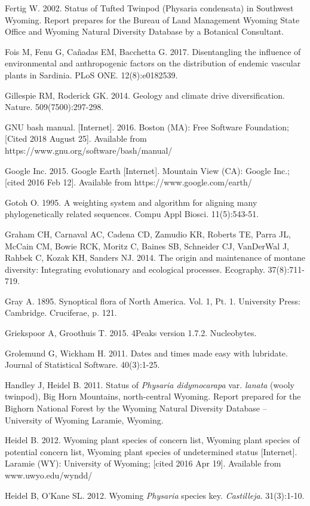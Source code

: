 Fertig W. 2002. Status of Tufted Twinpod (Physaria condensata) in Southwest Wyoming. Report prepares for the Bureau of Land Management Wyoming State Office and Wyoming Natural Diversity Database by a Botanical Consultant.

Fois M, Fenu G, Cañadas EM, Bacchetta G. 2017. Disentangling the influence of environmental and anthropogenic factors on the distribution of endemic vascular plants in Sardinia. PLoS ONE. 12(8):e0182539.

Gillespie RM, Roderick GK. 2014. Geology and climate drive diversification. Nature. 509(7500):297-298.

GNU bash manual. [Internet]. 2016. Boston (MA): Free Software Foundation; [Cited 2018 August 25]. Available from https://www.gnu.org/software/bash/manual/

Google Inc. 2015. Google Earth [Internet]. Mountain View (CA): Google Inc.; [cited 2016 Feb 12]. Available from https://www.google.com/earth/

Gotoh O. 1995. A weighting system and algorithm for aligning many phylogenetically related sequences. Compu Appl Biosci. 11(5):543-51.

Graham CH, Carnaval AC, Cadena CD, Zamudio KR, Roberts TE, Parra JL, McCain CM, Bowie RCK, Moritz C, Baines SB, Schneider CJ, VanDerWal J, Rahbek C, Kozak KH, Sanders NJ. 2014. The origin and maintenance of montane diversity: Integrating evolutionary and ecological processes. Ecography. 37(8):711-719.

Gray A. 1895. Synoptical flora of North America. Vol. 1, Pt. 1. University Press: Cambridge. Cruciferae, p. 121.

Griekspoor A, Groothuis T. 2015. 4Peaks version 1.7.2. Nucleobytes.

Grolemund G, Wickham H. 2011. Dates and times made easy with lubridate. Journal of Statistical Software. 40(3):1-25.

Handley J, Heidel B. 2011. Status of \textit{Physaria didymocarapa} var. \textit{lanata} (wooly twinpod), Big Horn Mountains, north-central Wyoming. Report prepared for the Bighorn National Forest by the Wyoming Natural Diversity Database – University of Wyoming Laramie, Wyoming.  

Heidel B. 2012. Wyoming plant species of concern list, Wyoming plant species of potential concern list, Wyoming plant species of undetermined status  [Internet]. Laramie (WY): University of Wyoming; [cited 2016 Apr 19]. Available from www.uwyo.edu/wyndd/

Heidel B, O’Kane SL. 2012. Wyoming \textit{Physaria} species key. \textit{Castilleja}. 31(3):1-10.


